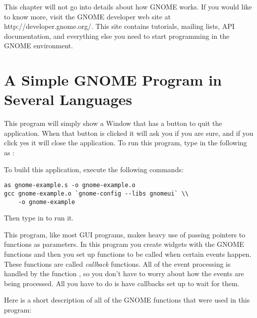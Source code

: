 This chapter will not go into details about how GNOME works.
If you would like to know more, visit the GNOME developer web
site at http://developer.gnome.org/.
This site contains tutorials, mailing lists, API documentation,
and everything else you need to start programming in the GNOME
environment.  

\section{A Simple GNOME Program in Several Languages}

This program will simply show a Window that has a button to
quit the application.  When that button is clicked it will
ask you if you are sure, and if you click yes it will close
the application.  To run this program, type in the following
as :

\begin{simpletyping}

\end{simpletyping}

To build this application, execute the following commands:

\begin{simpletyping}
\begin{lstlisting}
as gnome-example.s -o gnome-example.o
gcc gnome-example.o `gnome-config --libs gnomeui` \\
    -o gnome-example
\end{lstlisting}
\end{simpletyping}

Then type in  to run it.

This program, like most GUI programs, makes heavy use of 
passing pointers to functions as parameters.  In this program
you create widgets with the GNOME functions and then you
set up functions to be called when certain events happen.
These functions are called \emph{callback}
functions.  All of the event processing is handled by 
the function , so you don't
have to worry about how the events are being processed.
All you have to do is have callbacks set up to wait for
them.

Here is a short description of all of the GNOME functions
that were used in this program:


